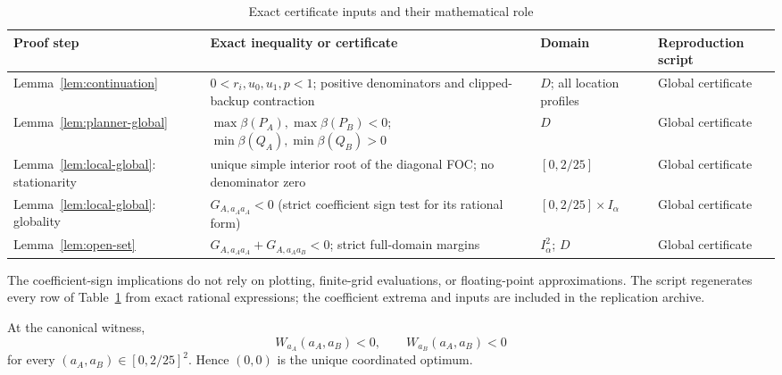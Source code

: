 \begin{table}[htbp]
\centering
\small
\caption{Exact certificate inputs and their mathematical role}\label{tab:global-certificate-map}
\begin{tabular}{>{\raggedright\arraybackslash}p{}>{\raggedright\arraybackslash}p{}>{\raggedright\arraybackslash}p{}>{\raggedright\arraybackslash}p{}}
\toprule
Proof step & Exact inequality or certificate & Domain & Reproduction script \\
\midrule
Lemma~\ref{lem:continuation} & $0<r_i,u_0,u_1,p<1$; positive denominators and clipped-backup contraction & $D$; all location profiles & Global certificate \\
Lemma~\ref{lem:planner-global} & $\max\beta(P_A),\max\beta(P_B)<0$; $\min\beta(Q_A),\min\beta(Q_B)>0$ & $D$ & Global certificate \\
Lemma~\ref{lem:local-global}: stationarity & unique simple interior root of the diagonal FOC; no denominator zero & $[0,2/25]$ & Global certificate \\
Lemma~\ref{lem:local-global}: globality & $G_{A,a_Aa_A}<0$ (strict coefficient sign test for its rational form) & $[0,2/25]\times I_\alpha$ & Global certificate \\
Lemma~\ref{lem:open-set} & $G_{A,a_Aa_A}+G_{A,a_Aa_B}<0$; strict full-domain margins & $I_\alpha^2$; $D$ & Global certificate \\
\bottomrule
\end{tabular}
\end{table}

The coefficient-sign implications do not rely on plotting, finite-grid evaluations, or floating-point approximations. The script  regenerates every row of Table~\ref{tab:global-certificate-map} from exact rational expressions; the coefficient extrema and inputs are included in the replication archive.

\begin{lemma}\label{lem:planner-global}
At the canonical witness,
\begin{equation}
W_{a_A}(a_A,a_B)<0,
\qquad
W_{a_B}(a_A,a_B)<0
\end{equation}
for every $(a_A,a_B)\in[0,2/25]^2$. Hence $(0,0)$ is the unique coordinated optimum.
\end{lemma}

